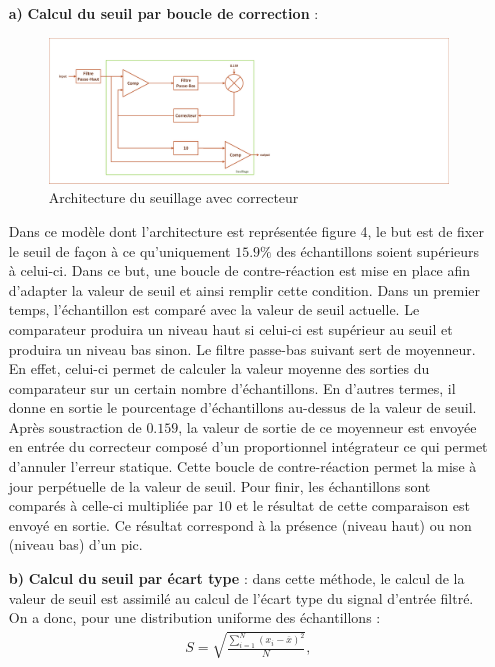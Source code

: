 \documentclass[a4paper,12pt]{article}
\begin{document}
\begin{itemize}
\begin{itemize}
\item[\textbf{a)}] \textbf{Calcul du seuil par boucle de correction} :
\begin{figure}[H]
\centering
\includegraphics[width=\textwidth, keepaspectratio]{chainCedric.pdf}
\caption{Architecture du seuillage avec correcteur}
\end{figure}
Dans ce modèle dont l'architecture est représentée figure 4, le but est de fixer le seuil de façon à ce qu'uniquement $15.9 \%$ des échantillons soient supérieurs à celui-ci. Dans ce but, une boucle de contre-réaction est mise en place afin d'adapter la valeur de seuil et ainsi remplir cette condition. Dans un premier temps, l'échantillon est comparé avec la valeur de seuil actuelle. Le comparateur produira un niveau haut si celui-ci est supérieur au seuil et produira un niveau bas sinon. Le filtre passe-bas suivant sert de moyenneur. En effet, celui-ci permet de calculer la valeur moyenne des sorties du comparateur sur un certain nombre d'échantillons. En d'autres termes, il donne en sortie le pourcentage d'échantillons au-dessus de la valeur de seuil. Après soustraction de $0.159$, la valeur de sortie de ce moyenneur est envoyée en entrée du correcteur composé d'un proportionnel intégrateur ce qui permet d'annuler l'erreur statique. Cette boucle de contre-réaction permet la mise à jour perpétuelle de la valeur de seuil. Pour finir, les échantillons sont comparés à celle-ci multipliée par $10$ et le résultat de cette comparaison est envoyé en sortie. Ce résultat correspond à la présence (niveau haut) ou non (niveau bas) d'un pic.
\item[\textbf{b)}] \textbf{Calcul du seuil par écart type} : dans cette méthode, le calcul de la valeur de seuil est assimilé au calcul de l'écart type du signal d'entrée filtré. On a donc, pour une distribution uniforme des échantillons :
\begin{eqnarray*}
S = \sqrt{\frac{\sum^N_{i=1}\left(x_i-\overline{x}\right)^2}{N}},
\end{eqnarray*}

\end{itemize}
\end{itemize}
\end{document}
